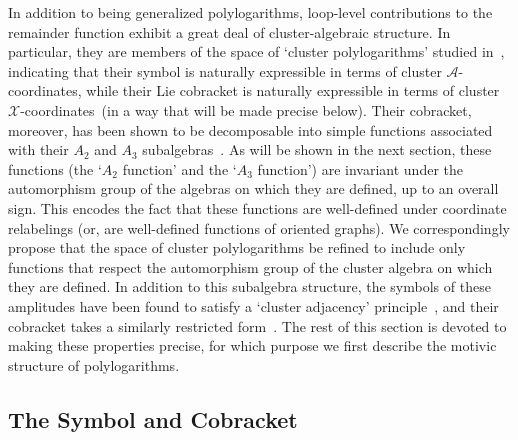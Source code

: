 \documentclass[12pt]{article}
\def\x{\mathcal{X}}
\def\xcoords{$\mathcal{X}$-coordinates}
\def\a{\mathcal{A}}
\def\acoords{$\mathcal{A}$-coordinates}
\def\bb2{B_2\wedge B_2}
\def\b3c{B_3 \otimes \mathbb{C}^*}
\begin{document}
In addition to being generalized polylogarithms, loop-level contributions to the remainder function exhibit a great deal of cluster-algebraic structure. In particular, they are members of the space of `cluster polylogarithms' studied in~\cite{Golden:2014xqa}, indicating that their symbol is naturally expressible in terms of cluster \acoords, while their Lie cobracket is naturally expressible in terms of cluster \xcoords\ (in a way that will be made precise below). Their cobracket, moreover, has been shown to be decomposable into simple functions associated with their $A_2$ and $A_3$ subalgebras~\cite{Golden:2014xqa}. As will be shown in the next section, these functions (the `$A_2$ function' and the `$A_3$ function') are invariant under the automorphism group of the algebras on which they are defined, up to an overall sign. This encodes the fact that these functions are well-defined under coordinate relabelings (or, are well-defined functions of oriented graphs). We correspondingly propose that the space of cluster polylogarithms be refined to include only functions that respect the automorphism group of the cluster algebra on which they are defined. In addition to this subalgebra structure, the symbols of these amplitudes have been found to satisfy a `cluster adjacency' principle~\cite{Drummond:2017ssj}, and their cobracket takes a similarly restricted form~\cite{Golden:2014xqf}. The rest of this section is devoted to making these properties precise, for which purpose we first describe the motivic structure of polylogarithms. 

\subsection{The Symbol and Cobracket} \label{sec:coproduct}


\end{document}
